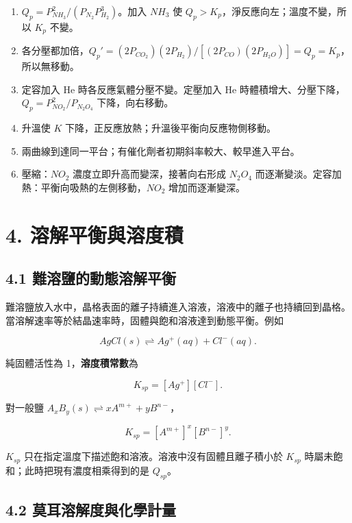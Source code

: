 \documentclass[11pt,a4paper]{article}
\providecommand{\tightlist}{%
  \setlength{\itemsep}{0pt}\setlength{\parskip}{0pt}}
\begin{document}
\begin{enumerate}
\def\labelenumi{\arabic{enumi}.}
\tightlist
\item
  \(Q_p=P_{NH_3}^2/(P_{N_2}P_{H_2}^3)\)。加入 \(NH_3\) 使 \(Q_p>K_p\)，淨反應向左；溫度不變，所以 \(K_p\) 不變。
\item
  各分壓都加倍，\(Q_p'=(2P_{CO_2})(2P_{H_2})/[(2P_{CO})(2P_{H_2O})]=Q_p=K_p\)，所以無移動。
\item
  定容加入 He 時各反應氣體分壓不變。定壓加入 He 時體積增大、分壓下降，\(Q_p=P_{NO_2}^2/P_{N_2O_4}\) 下降，向右移動。
\item
  升溫使 \(K\) 下降，正反應放熱；升溫後平衡向反應物側移動。
\item
  兩曲線到達同一平台；有催化劑者初期斜率較大、較早進入平台。
\item
  壓縮：\(NO_2\) 濃度立即升高而變深，接著向右形成 \(N_2O_4\) 而逐漸變淡。定容加熱：平衡向吸熱的左側移動，\(NO_2\) 增加而逐漸變深。
\end{enumerate}

\clearpage

\section{4. 溶解平衡與溶度積}\label{ux6eb6ux89e3ux5e73ux8861ux8207ux6eb6ux5ea6ux7a4d}

\subsection{4.1 難溶鹽的動態溶解平衡}\label{ux96e3ux6eb6ux9e7dux7684ux52d5ux614bux6eb6ux89e3ux5e73ux8861}

難溶鹽放入水中，晶格表面的離子持續進入溶液，溶液中的離子也持續回到晶格。當溶解速率等於結晶速率時，固體與飽和溶液達到動態平衡。例如

\[
AgCl(s)\rightleftharpoons Ag^+(aq)+Cl^-(aq).
\]

純固體活性為 1，\textbf{溶度積常數}為

\[
K_{sp}=[Ag^+][Cl^-].
\]

對一般鹽 \(A_xB_y(s)\rightleftharpoons xA^{m+}+yB^{n-}\)，

\[
K_{sp}=[A^{m+}]^x[B^{n-}]^y.
\]

\(K_{sp}\) 只在指定溫度下描述飽和溶液。溶液中沒有固體且離子積小於 \(K_{sp}\) 時屬未飽和；此時把現有濃度相乘得到的是 \(Q_{sp}\)。

\subsection{4.2 莫耳溶解度與化學計量}\label{ux83abux8033ux6eb6ux89e3ux5ea6ux8207ux5316ux5b78ux8a08ux91cf}
\end{document}
